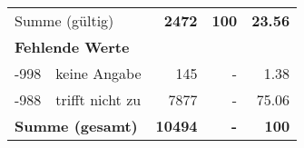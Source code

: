 \begin{longtable}{lXrrr}
     \midrule
     \multicolumn{2}{l}{Summe (gültig)} &
       \textbf{\num{2472}} &
     \textbf{100} &
       \textbf{\num[round-mode=places,round-precision=2]{23,56}} \\
     \multicolumn{5}{l}{\textbf{Fehlende Werte}}\\
       -998 &
       keine Angabe &
         \num{145} &
        - &
         \num[round-mode=places,round-precision=2]{1,38} \\
       -988 &
       trifft nicht zu &
         \num{7877} &
        - &
         \num[round-mode=places,round-precision=2]{75,06} \\
     \midrule
     \multicolumn{2}{l}{\textbf{Summe (gesamt)}} &
          \textbf{\num{10494}} &
        \textbf{-} &
        \textbf{100} \\
     \bottomrule
     \end{longtable}
     

